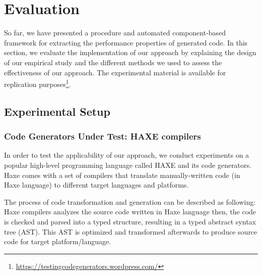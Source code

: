\section{Evaluation}
So far, we have presented a procedure and automated compo\-nent-based framework for extracting the performance properties of generated code. In this section, we evaluate the implementation of our approach by explaining the design of our empirical study and the different methods we used to assess the effectiveness of our approach. 
The experimental material is available for replication purposes\footnote{\url{https://testingcodegenerators.wordpress.com/}}.
\subsection{Experimental Setup}
\subsubsection{Code Generators Under Test: HAXE compilers}
In order to test the applicability of our approach, we conduct experiments on a popular high-level programming language called HAXE and its code generators. 
Haxe comes with a set of compilers that translate manually-written code (in Haxe language) to different target languages and platforms. 

The process of code transformation and generation can be described as following: Haxe compilers analyzes the source code written in Haxe language then, the code is checked and parsed into a typed structure, resulting in a typed abstract syntax tree (AST). This AST is optimized and transformed afterwards to produce source code for target platform/language.

